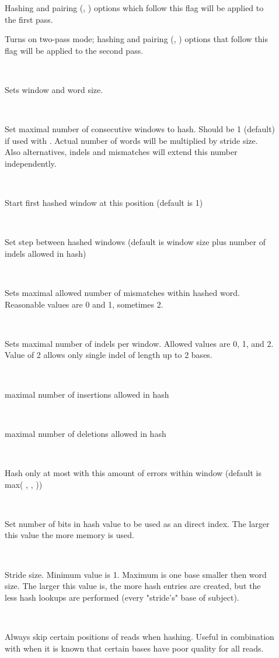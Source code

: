 \documentclass[english]{article}
\begin{document}
\begin{description}
\item[]
				Hashing and pairing (, ) options which follow this flag will 
                be applied to the first pass.
\item[]
				Turns on two-pass mode; hashing and pairing (, ) options  
                that follow this flag will be applied to the second pass.
\item[~~]
                Sets window and word size.
\item[~~]
				Set maximal number of consecutive windows to hash.
                Should be 1 (default) if used with . Actual number of words
                will be multiplied by stride size. Also alternatives, indels 
                and mismatches will extend this number independently.
\item[~~]
				Start first hashed window at this position (default is 1)
\item[~~]
				Set step between hashed windows (default is window size plus 
                number of indels allowed in hash)
\item[~~]
				Sets maximal allowed number of mismatches within hashed word.
                Reasonable values are 0 and 1, sometimes 2.
\item[~~]
				Sets maximal number of indels per window. Allowed values are 
                0, 1, and 2.  Value of 2 allows only single indel of length 
                up to 2 bases.
\item[~~]
				maximal number of insertions allowed in hash
\item[~~]
				maximal number of deletions allowed in hash
\item[~~]
				Hash only at most with this amount of errors within window 
                (default is max( , ,  ))
\item[~~]
				Set number of bits in hash value to be used as an direct index.
                The larger this value the more memory is used.
\item[~~]
				Stride size. Minimum value is 1. Maximum is one base smaller 
                then word size. The larger this value is, the more hash 
                entries are created, but the less hash lookups are performed
                (every "stride's" base of subject). 
\item[~~]
				Always skip certain positions of reads when hashing.
                Useful in combination with  when it is known that certain
                bases have poor quality for all reads.


\end{description}
\end{document}
